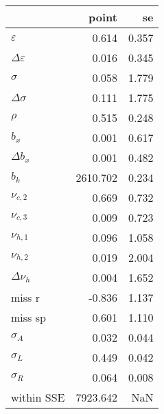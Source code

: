 \begin{tabular}{lrr}
\toprule
{} &     point &     se \\
\midrule
$\varepsilon$       &     0.614 &  0.357 \\
$\Delta\varepsilon$ &     0.016 &  0.345 \\
$\sigma$            &     0.058 &  1.779 \\
$\Delta\sigma$      &     0.111 &  1.775 \\
$\rho$              &     0.515 &  0.248 \\
$b_x$               &     0.001 &  0.617 \\
$\Delta b_x$        &     0.001 &  0.482 \\
$b_k$               &  2610.702 &  0.234 \\
$\nu_{c,2}$         &     0.669 &  0.732 \\
$\nu_{c,3}$         &     0.009 &  0.723 \\
$\nu_{h,1}$         &     0.096 &  1.058 \\
$\nu_{h,2}$         &     0.019 &  2.004 \\
$\Delta \nu_{h}$    &     0.004 &  1.652 \\
miss r              &    -0.836 &  1.137 \\
miss sp             &     0.601 &  1.110 \\
$\sigma_{A}$        &     0.032 &  0.044 \\
$\sigma_{L}$        &     0.449 &  0.042 \\
$\sigma_{R}$        &     0.064 &  0.008 \\
within SSE          &  7923.642 &    NaN \\
\bottomrule
\end{tabular}
